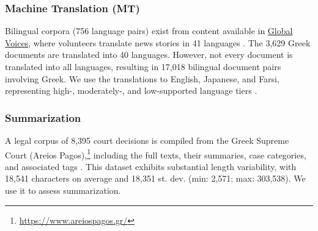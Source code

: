 \documentclass[sigconf,review,anonymous]{acmart}
\begin{document}
\subsubsection{Machine Translation (MT)}\label{ssec:mt}
Bilingual corpora (756 language pairs) exist from content available in \href{https://globalvoices.org/}{Global Voices}, where volunteers translate news stories in 41 languages \cite{prokopidis-2016-parallel}. The 3,629 Greek documents are translated into 40 languages. However, not every document is translated into all languages, resulting in 17,018 bilingual document pairs involving Greek. We use the translations to English, Japanese, and Farsi, representing high-, moderately-, and low-supported language tiers \cite{bakagianni2025systematic}. %

\subsubsection{Summarization}\label{ssec:summarization}
A legal corpus of 8,395 court decisions is compiled from the Greek Supreme Court (Areios Pagos),\footnote{\url{https://www.areiospagos.gr/}} including the full texts, their summaries, case categories, and associated tags \cite{koniaris2023evaluation}. This dataset exhibits substantial length variability, with 18,541 characters on average and 18,351 st. dev. (min: 2,571; max: 303,538).
We use it to assess summarization.

\begin{table}[t]
\caption{Dataset statistics for downstream Greek NLP tasks. We report test set size, number of classes (\#C), average text length (in characters), and class imbalance ratio (CIR; smallest-to-largest class proportion) where applicable. Datasets split by us are marked with $\dagger$.}
\label{tab:downstream_stats}
\centering{}
\end{table}
\end{document}
